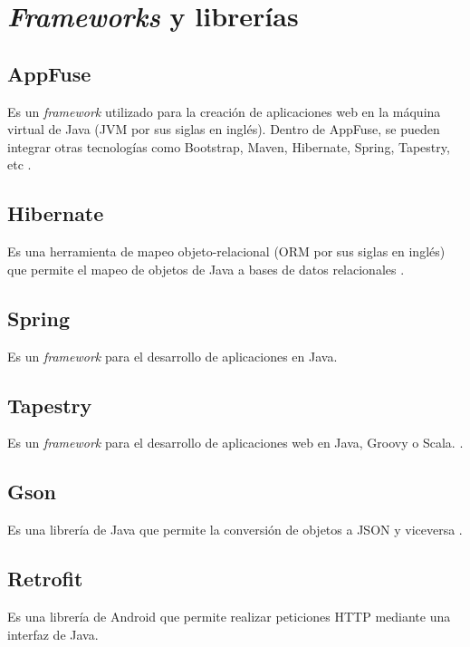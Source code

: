 \section{\textit{Frameworks} y librerías} \label{Frameworks y librerias}

\subsection{AppFuse}
Es un \textit{framework} utilizado para la creación de aplicaciones web en la máquina virtual de Java (JVM por sus siglas en inglés). Dentro de AppFuse, se pueden integrar otras tecnologías como Bootstrap, Maven, Hibernate, Spring, Tapestry, etc \cite{APF1}.

\subsection{Hibernate}
Es una herramienta de mapeo objeto-relacional (ORM por sus siglas en inglés) que permite el mapeo de objetos de Java a bases de datos relacionales \cite{HBR1}.

\subsection{Spring}
Es un \textit{framework} para el desarrollo de aplicaciones en Java.

\subsection{Tapestry}
Es un \textit{framework} para el desarrollo de aplicaciones web en Java, Groovy o Scala.  \cite{ATP1}.

\subsection{Gson}
Es una librería de Java que permite la conversión de objetos a JSON y viceversa \cite{GSN1}
.
\subsection{Retrofit}
Es una librería de Android que permite realizar peticiones HTTP mediante una interfaz de Java\cite{RFT1}.